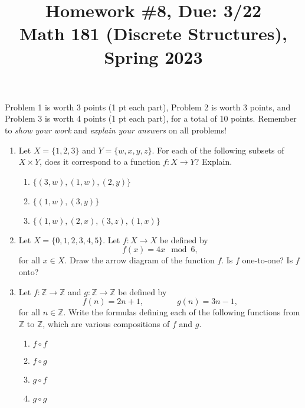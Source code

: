 \documentclass[11pt]{article}
\title{Homework \#8, Due: 3/22 \\Math 181 (Discrete Structures), Spring 2023}
\date{}
\begin{document}
\maketitle

\thispagestyle{empty}

\vspace{-1cm}

Problem 1 is worth 3 points (1 pt each part), Problem 2 is worth 3 points, and Problem 3 is worth 4 points (1 pt each part), for a total of 10 points. Remember to \emph{show your work} and \emph{explain your answers} on all problems!

\begin{enumerate}

\item Let $X=\{1,2,3\}$ and $Y=\{w,x,y,z\}$. For each of the following subsets of $X \times Y$, does it correspond to a function $f \colon X \to Y$? Explain.
\begin{enumerate}
\item $\{(3,w),(1,w),(2,y)\}$
\item $\{(1,w),(3,y)\}$
\item $\{(1,w),(2,x),(3,z),(1,x)\}$
\end{enumerate}

\item Let $X = \{0,1,2,3,4,5\}$. Let $f\colon X \to X$ be defined by 
\[f(x) = 4x \mod 6,\] 
for all $x \in X$. Draw the arrow diagram of the function $f$. Is $f$ one-to-one? Is $f$ onto?

\item Let $f\colon \mathbb{Z} \to \mathbb{Z}$ and $g\colon\mathbb{Z}\to \mathbb{Z}$ be defined by
\[ f(n) = 2n+1, \qquad \qquad g(n) = 3n-1,\]
for all $n \in \mathbb{Z}$. Write the formulas defining each of the following functions from $\mathbb{Z}$ to $\mathbb{Z}$, which are various compositions of $f$ and $g$.
\begin{enumerate}
\item $f \circ f$
\item $f \circ g$
\item $g \circ f$
\item $g \circ g$
\end{enumerate}

\end{enumerate}
\end{document}
